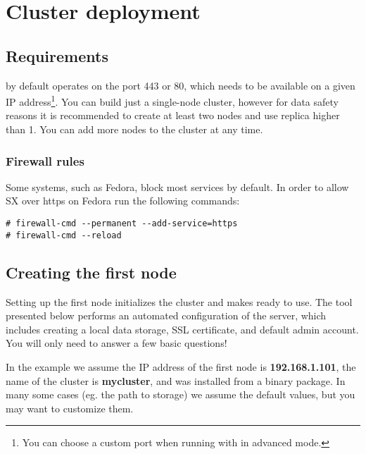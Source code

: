 \chapter{Cluster deployment}

\section{Requirements}

\SX by default operates on the port 443 or 80, which needs to be available on
a given IP address\footnote{You can choose a custom port when running  with
in advanced mode.}. You can build just a single-node \SX cluster, however for data
safety reasons it is recommended to create at least two nodes and use replica higher
than 1. You can add more nodes to the cluster at any time.

\subsection{Firewall rules}
Some systems, such as Fedora, block most services by default. In order to allow
SX over https on Fedora run the following commands:
\begin{lstlisting}
# firewall-cmd --permanent --add-service=https
# firewall-cmd --reload
\end{lstlisting}

\section{Creating the first node}

Setting up the first node initializes the cluster and makes \SX ready to
use. The  tool presented below performs an automated
configuration of the \SX server, which includes creating a local
data storage, SSL certificate, and default admin account. You will only
need to answer a few basic questions!

In the example we assume the IP address of the first node is
\textbf{192.168.1.101}, the name of the cluster is \textbf{mycluster},
and \SX was installed from a binary package. In many some cases (eg. the
path to \SX storage) we assume the default values, but you may want to
customize them.

